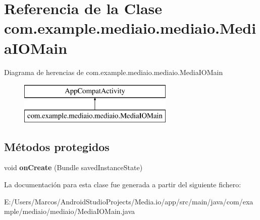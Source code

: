\hypertarget{classcom_1_1example_1_1mediaio_1_1mediaio_1_1_media_i_o_main}{}\section{Referencia de la Clase com.\+example.\+mediaio.\+mediaio.\+Media\+I\+O\+Main}
\label{classcom_1_1example_1_1mediaio_1_1mediaio_1_1_media_i_o_main}
Diagrama de herencias de com.\+example.\+mediaio.\+mediaio.\+Media\+I\+O\+Main\begin{figure}[H]
\begin{center}
\leavevmode
\includegraphics[height=2.000000cm]{classcom_1_1example_1_1mediaio_1_1mediaio_1_1_media_i_o_main}
\end{center}
\end{figure}
\subsection*{Métodos protegidos}
\begin{DoxyCompactItemize}
\item 
\mbox{\label{classcom_1_1example_1_1mediaio_1_1mediaio_1_1_media_i_o_main_acb26bcbdec3a3c537c4d95a4f4caf07d}} 
void {\bfseries on\+Create} (Bundle saved\+Instance\+State)
\end{DoxyCompactItemize}


La documentación para esta clase fue generada a partir del siguiente fichero\+:\begin{DoxyCompactItemize}
\item 
E\+:/\+Users/\+Marcos/\+Android\+Studio\+Projects/\+Media.\+io/app/src/main/java/com/example/mediaio/mediaio/Media\+I\+O\+Main.\+java\end{DoxyCompactItemize}

